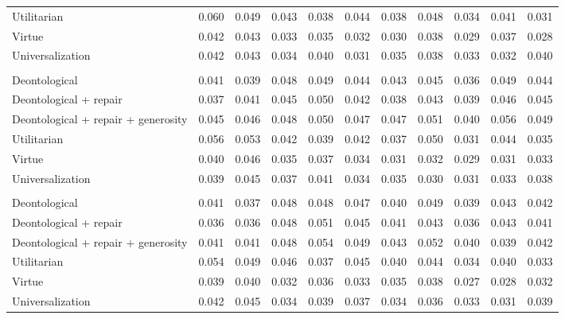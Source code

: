 \begin{table}[t]
\begin{tabular}{lrrrrrrrrrr}
Utilitarian & 0.060 & 0.049 & 0.043 & 0.038 & 0.044 & 0.038 & 0.048 & 0.034 & 0.041 & 0.031 \\
Virtue & 0.042 & 0.043 & 0.033 & 0.035 & 0.032 & 0.030 & 0.038 & 0.029 & 0.037 & 0.028 \\
Universalization & 0.042 & 0.043 & 0.034 & 0.040 & 0.031 & 0.035 & 0.038 & 0.033 & 0.032 & 0.040 \\
\addlinespace
\multicolumn{11}{l}{\emph{Stag Hunt}} \\
Deontological & 0.041 & 0.039 & 0.048 & 0.049 & 0.044 & 0.043 & 0.045 & 0.036 & 0.049 & 0.044 \\
Deontological + repair & 0.037 & 0.041 & 0.045 & 0.050 & 0.042 & 0.038 & 0.043 & 0.039 & 0.046 & 0.045 \\
Deontological + repair + generosity & 0.045 & 0.046 & 0.048 & 0.050 & 0.047 & 0.047 & 0.051 & 0.040 & 0.056 & 0.049 \\
Utilitarian & 0.056 & 0.053 & 0.042 & 0.039 & 0.042 & 0.037 & 0.050 & 0.031 & 0.044 & 0.035 \\
Virtue & 0.040 & 0.046 & 0.035 & 0.037 & 0.034 & 0.031 & 0.032 & 0.029 & 0.031 & 0.033 \\
Universalization & 0.039 & 0.045 & 0.037 & 0.041 & 0.034 & 0.035 & 0.030 & 0.031 & 0.033 & 0.038 \\
\addlinespace
\multicolumn{11}{l}{\emph{Chicken}} \\
Deontological & 0.041 & 0.037 & 0.048 & 0.048 & 0.047 & 0.040 & 0.049 & 0.039 & 0.043 & 0.042 \\
Deontological + repair & 0.036 & 0.036 & 0.048 & 0.051 & 0.045 & 0.041 & 0.043 & 0.036 & 0.043 & 0.041 \\
Deontological + repair + generosity & 0.041 & 0.041 & 0.048 & 0.054 & 0.049 & 0.043 & 0.052 & 0.040 & 0.039 & 0.042 \\
Utilitarian & 0.054 & 0.049 & 0.046 & 0.037 & 0.045 & 0.040 & 0.044 & 0.034 & 0.040 & 0.033 \\
Virtue & 0.039 & 0.040 & 0.032 & 0.036 & 0.033 & 0.035 & 0.038 & 0.027 & 0.028 & 0.032 \\
Universalization & 0.042 & 0.045 & 0.034 & 0.039 & 0.037 & 0.034 & 0.036 & 0.033 & 0.031 & 0.039 \\
\bottomrule
\end{tabular}
\end{table}
